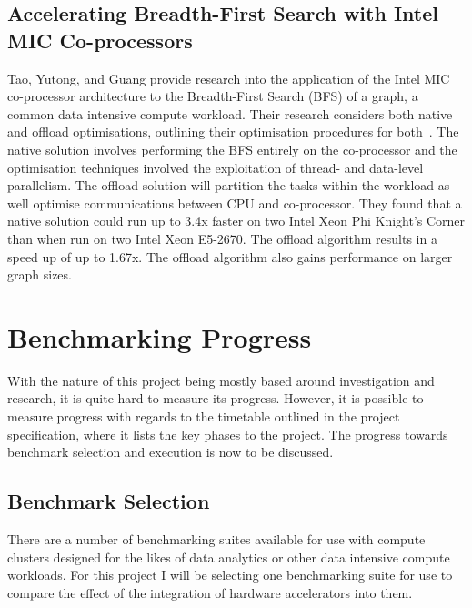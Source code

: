 \documentclass[12pt,a4paper]{article}
\begin{document}
        \subsection{Accelerating Breadth-First Search with Intel MIC Co-processors}
        \label{sub:accelerating_bfs_with_mic}
        
            Tao, Yutong, and Guang provide research into the application of the Intel MIC co-processor architecture to the Breadth-First Search (BFS) of a graph, a common data intensive compute workload. Their research considers both native and offload optimisations, outlining their optimisation procedures for both~\cite{mic-accelerate-bfs}. The native solution involves performing the BFS entirely on the co-processor and the optimisation techniques involved the exploitation of thread- and data-level parallelism. The offload solution will partition the tasks within the workload as well optimise communications between CPU and co-processor. They found that a native solution could run up to 3.4x faster on two Intel Xeon Phi Knight's Corner than when run on two Intel Xeon E5-2670. The offload algorithm results in a speed up of up to 1.67x. The offload algorithm also gains performance on larger graph sizes.
    
    \section{Benchmarking Progress}
    \label{sec:benchmarking_progress}
    
        With the nature of this project being mostly based around investigation and research, it is quite hard to measure its progress. However, it is possible to measure progress with regards to the timetable outlined in the project specification, where it lists the key phases to the project. The progress towards benchmark selection and execution is now to be discussed.
    
        \subsection{Benchmark Selection}
        \label{sub:benchmark_selection}
        
            There are a number of benchmarking suites available for use with compute clusters designed for the likes of data analytics or other data intensive compute workloads. For this project I will be selecting one benchmarking suite for use to compare the effect of the integration of hardware accelerators into them.
            
\end{document}
